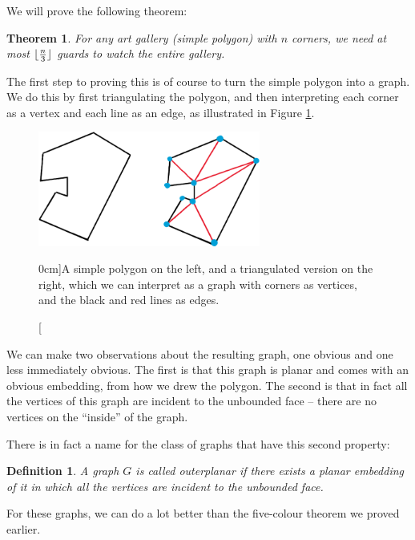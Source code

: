 \documentclass[nobib]{tufte-handout}
\newtheorem{definition}{Definition}
\newtheorem{theorem}{Theorem}
\DeclarePairedDelimiter\floor{\lfloor}{\rfloor}
\begin{document}
We will prove the following theorem:

\begin{theorem}
  For any art gallery (simple polygon) with $n$ corners, we need at most $\floor{\frac{n}{3}}$ guards to watch the entire gallery.
\end{theorem}

The first step to proving this is of course to turn the simple polygon into a graph. We do this by first triangulating the polygon, and then interpreting each corner as a vertex and each line as an edge, as illustrated in Figure \ref{fig:triangulated_polygon}.

\begin{figure}
  \centering
  \includegraphics[width=0.65\textwidth]{graphics/L12_colouring/triangulated_polygon.png}
  \caption[][0cm]{A simple polygon on the left, and a triangulated version on the right, which we can interpret as a graph with corners as vertices, and the black and red lines as edges.}
  \label{fig:triangulated_polygon}
\end{figure}

We can make two observations about the resulting graph, one obvious and one less immediately obvious. The first is that this graph is planar and comes with an obvious embedding, from how we drew the polygon. The second is that in fact all the vertices of this graph are incident to the unbounded face -- there are no vertices on the ``inside'' of the graph.

There is in fact a name for the class of graphs that have this second property:

\begin{definition}
  A graph $G$ is called \emph{outerplanar} if there exists a planar embedding of it in which all the vertices are incident to the unbounded face.
\end{definition}

For these graphs, we can do a lot better than the five-colour theorem we proved earlier.
\end{document}
